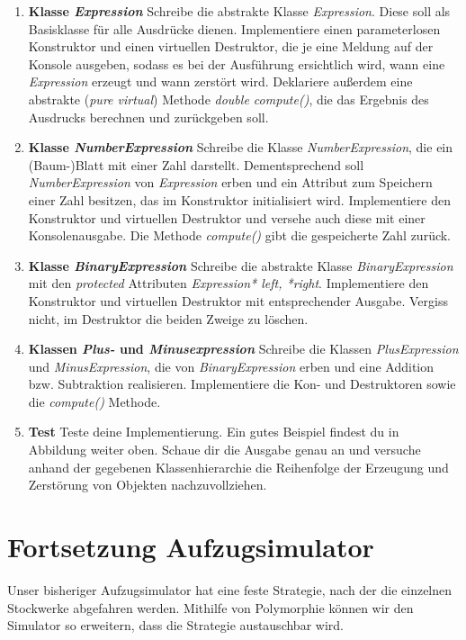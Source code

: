 \documentclass[
  accentcolor=tud1c,	%
  colorbacktitle,		%
  inverttitle,			%
  german,				%
  twoside
]{tudexercise}
\begin{document}
\begin{enumerate}

\item \textbf{Klasse \emph{Expression}}
Schreibe die abstrakte Klasse \emph{Expression}.
Diese soll als Basisklasse für alle Ausdrücke dienen.
Implementiere einen parameterlosen Konstruktor und einen virtuellen Destruktor, die je eine Meldung auf der Konsole ausgeben, sodass es bei der Ausführung ersichtlich wird, wann eine \emph{Expression} erzeugt und wann zerstört wird.
Deklariere außerdem eine abstrakte (\emph{pure virtual}) Methode \emph{double compute()}, die das Ergebnis des Ausdrucks berechnen und zurückgeben soll. 

\item \textbf{Klasse \emph{NumberExpression}}
Schreibe die Klasse \emph{NumberExpression}, die ein (Baum-)Blatt mit einer Zahl darstellt.
Dementsprechend soll \emph{NumberExpression} von \emph{Expression} erben und ein Attribut zum Speichern einer Zahl besitzen, das im Konstruktor initialisiert wird.
Implementiere den Konstruktor und virtuellen Destruktor und versehe auch diese mit einer Konsolenausgabe.
Die Methode \emph{compute()} gibt die gespeicherte Zahl zurück.

\item \textbf{Klasse \emph{BinaryExpression}}
Schreibe die abstrakte Klasse \emph{BinaryExpression} mit den \emph{protected} Attributen \emph{Expression* left, *right}.
Implementiere den Konstruktor und virtuellen Destruktor mit entsprechender Ausgabe.
Vergiss nicht, im Destruktor die beiden Zweige zu löschen. 

\item \textbf{Klassen \emph{Plus-} und \emph{Minusexpression}}
Schreibe die Klassen \emph{PlusExpression} und \emph{MinusExpression}, die von \emph{BinaryExpression} erben und eine Addition bzw. Subtraktion realisieren. 
Implementiere die Kon- und Destruktoren sowie die \emph{compute()} Methode.

\item \textbf{Test}
Teste deine Implementierung.
Ein gutes Beispiel findest du in Abbildung weiter oben.
Schaue dir die Ausgabe genau an und versuche anhand der gegebenen Klassenhierarchie die Reihenfolge der Erzeugung und Zerstörung von Objekten  nachzuvollziehen.

\end{enumerate}

\section{Fortsetzung Aufzugsimulator}
Unser bisheriger Aufzugsimulator hat eine feste Strategie, nach der die einzelnen Stockwerke abgefahren werden. Mithilfe von Polymorphie können wir den Simulator so erweitern, dass die Strategie austauschbar wird.  
\end{document}
